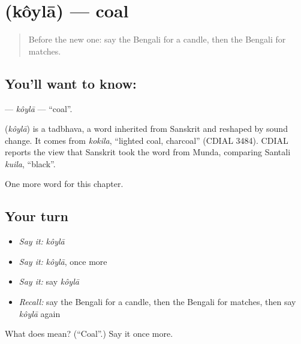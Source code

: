\section[\texorpdfstring{\bn{কয়লা} (kôylā)}{কয়লা (kôylā)}]{ (kôylā) — coal}

\label{lesson:BN-C110-koyla}



\begin{quote}
Before the new one: say the Bengali for a candle, then the Bengali for matches.
\end{quote}

\subsection*{You'll want to know: }
\textbf{} — \emph{kôylā} — \textquotedblleft{}coal\textquotedblright{}.

\begin{cousinweb}
\textbf{} (\emph{kôylā}) is a tadbhava, a word inherited from Sanskrit and reshaped by sound change. It comes from \emph{kokila}, \textquotedblleft{}lighted coal, charcoal\textquotedblright{} (CDIAL 3484). CDIAL reports the view that Sanskrit took the word from Munda, comparing Santali \emph{kuila}, \textquotedblleft{}black\textquotedblright{}.
\end{cousinweb}

\begin{grammarlens}[title={What you've built}]
One more word for this chapter.
\end{grammarlens}

\subsection*{Your turn}
\begin{itemize}
\raggedright
  \item \emph{Say it:} \emph{kôylā}
  \item \emph{Say it:} \emph{kôylā}, once more
  \item \emph{Say it:} say \emph{kôylā}
  \item \emph{Recall:} say the Bengali for a candle, then the Bengali for matches, then say \emph{kôylā} again
\end{itemize}

\begin{tcolorbox}[breakable,colback=teal!4,colframe=teal!35!black,title={Before you move on}]
What does  mean? (\textquotedblleft{}Coal\textquotedblright{}.) Say it once more.
\end{tcolorbox}
